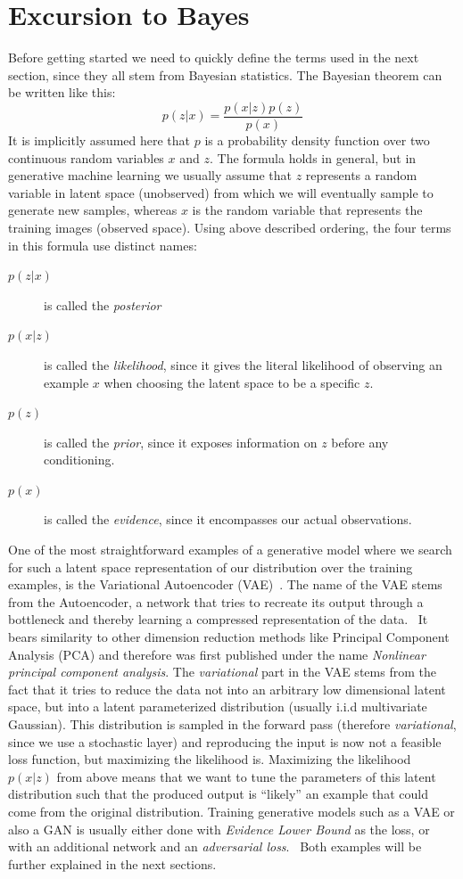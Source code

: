 \section{Excursion to Bayes}
Before getting started we need to quickly define the terms used in the next section, since they all stem from Bayesian
statistics. The Bayesian theorem can be written like this:
\begin{equation}
    p(z|x) = \frac{p(x|z)p(z)}{p(x)}
\end{equation}
It is implicitly assumed here that $p$ is a probability density function over two continuous random variables $x$ and $z$.
The formula holds in general, but in generative machine learning we usually assume that $z$ represents a random variable in
latent space (unobserved) from which we will eventually sample to generate new samples, whereas $x$ is the random variable that
represents the training images (observed space).
Using above described ordering, the four terms in this formula use distinct names:
\begin{description}
    \item[$p(z|x)$] is called the \textit{posterior}
    \item[$p(x|z)$] is called the \textit{likelihood}, since it gives the literal likelihood of observing an example $x$ when
        choosing the latent space to be a specific $z$.
    \item[$p(z)$] is called the \textit{prior}, since it exposes information on $z$ before any conditioning.
    \item[$p(x)$] is called the \textit{evidence}, since it encompasses our actual observations.
\end{description}
One of the most straightforward examples of a generative model where we search for such a latent space representation of
our distribution over the training examples, is the Variational Autoencoder (VAE)~\autocite{kingma2022autoencoding}. The name of the VAE stems from the Autoencoder,
a network that tries to recreate its output through a bottleneck and thereby learning a compressed representation of the data.~\autocite{https://doi.org/10.1002/aic.690370209}
It bears similarity to other dimension reduction methods like Principal Component Analysis (PCA) and therefore was first published under the name
\textit{Nonlinear principal component analysis}. The \textit{variational} part in the VAE stems from the fact that it tries to reduce the data not into
an arbitrary low dimensional latent space, but into a latent parameterized distribution (usually i.i.d multivariate Gaussian). This distribution is sampled
in the forward pass (therefore \textit{variational}, since we use a stochastic layer) and reproducing the input is now not a feasible loss function, but
maximizing the likelihood is. Maximizing the likelihood $p(x|z)$ from above means that we want to tune the parameters of this latent distribution such that the produced
output is \enquote{likely} an example that could come from the original distribution. Training generative models such as a VAE or also a GAN is usually either done with \textit{Evidence Lower Bound} as the loss, or with an additional network and an \textit{adversarial loss}.~\autocite{goodfellow2014generative} Both examples will be further explained in the next sections.

